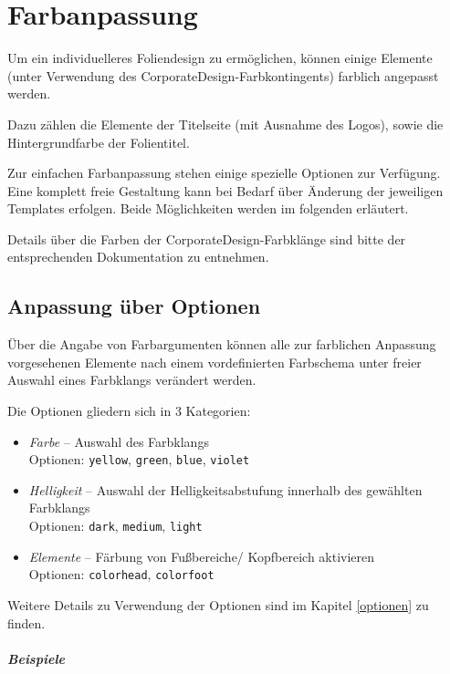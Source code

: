 \documentclass[cmyk,a4paper,colorscheme=green,TUBStitlepage=picture]{tubsreprt}
\begin{document}
\chapter{Farbanpassung}

Um ein individuelleres Foliendesign zu ermöglichen, können einige Elemente
(unter Verwendung des CorporateDesign-Farbkontingents)
farblich angepasst werden.

Dazu zählen die Elemente der Titelseite (mit Ausnahme des Logos),
sowie die Hintergrundfarbe der Folientitel.

Zur einfachen Farbanpassung stehen einige spezielle Optionen zur Verfügung.
Eine komplett freie Gestaltung kann bei Bedarf über Änderung der
jeweiligen Templates erfolgen. Beide Möglichkeiten werden im folgenden
erläutert.

Details über die Farben der CorporateDesign-Farbklänge sind bitte der
entsprechenden Dokumentation zu entnehmen.%

\section{Anpassung über Optionen}

Über die Angabe von Farbargumenten können alle zur farblichen Anpassung
vorgesehenen Elemente nach einem vordefinierten Farbschema unter freier Auswahl
eines Farbklangs verändert werden.

Die Optionen gliedern sich in 3 Kategorien:
\begin{itemize}
  \item \emph{Farbe} -- Auswahl des Farbklangs\\
    Optionen: \texttt{yellow}, \texttt{green}, \texttt{blue}, \texttt{violet}
  \item \emph{Helligkeit} -- Auswahl der Helligkeitsabstufung
    innerhalb des gewählten Farbklangs\\
    Optionen: \texttt{dark}, \texttt{medium}, \texttt{light}
  \item \emph{Elemente} -- Färbung von Fußbereiche/ Kopfbereich aktivieren\\
    Optionen: \texttt{colorhead}, \texttt{colorfoot}
\end{itemize}

Weitere Details zu Verwendung der Optionen sind im Kapitel \ref{optionen}
zu finden.

\clearpage
\paragraph{Beispiele}\hfill\\
\end{document}
